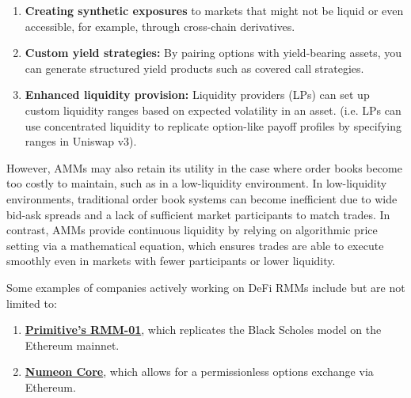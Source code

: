 \documentclass[12pt]{article}
\begin{document}
\begin{enumerate}
    \item \textbf{Creating synthetic exposures} to markets that might not be liquid or even accessible, for example, through cross-chain derivatives.
    \item \textbf{Custom yield strategies:} By pairing options with yield-bearing assets, you can generate structured yield products such as covered call strategies.
    \item \textbf{Enhanced liquidity provision:} Liquidity providers (LPs) can set up custom liquidity ranges based on expected volatility in an asset. (i.e. LPs can use concentrated liquidity to replicate option-like payoff profiles by specifying ranges in Uniswap v3).
\end{enumerate}

However, AMMs may also retain its utility in the case where order books become too costly to maintain, such as in a low-liquidity environment. In low-liquidity environments, traditional order book systems can become inefficient due to wide bid-ask spreads and a lack of sufficient market participants to match trades. In contrast, AMMs provide continuous liquidity by relying on algorithmic price setting via a mathematical equation, which ensures trades are able to execute smoothly even in markets with fewer participants or lower liquidity. 

Some examples of companies actively working on DeFi RMMs include but are not limited to:
\begin{enumerate}
    \item \href{https://www.primitive.xyz/papers/Whitepaper.pdf}{\textbf{Primitive’s RMM-01}}, which replicates the Black Scholes model on the Ethereum mainnet.
    \item \href{https://github.com/numotrade/whitepaper/blob/main/numoen_whitepaper_v1.pdf}{\textbf{Numeon Core}}, which allows for a permissionless options exchange via Ethereum. 
\end{enumerate}

\end{document}
